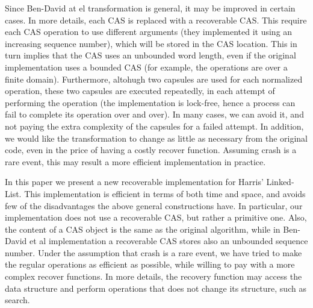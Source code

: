 Since Ben-David at el transformation is general, it may be improved in certain cases. In more details, each CAS is replaced with a recoverable CAS. This require each CAS operation to use different arguments (they implemented it using an increasing sequence number), which will be stored in the CAS location. This in turn implies that the CAS uses an unbounded word length, even if the original implementation uses a bounded CAS (for example, the operations are over a finite domain). Furthermore, altohugh two capsules are used for each normalized operation, these two capsules are executed repeatedly, in each attempt of performing the operation (the implementation is lock-free, hence a process can fail to complete its operation over and over). In many cases, we can avoid it, and not paying the extra complexity of the capsules for a failed attempt.
In addition, we would like the transformation to change as little as necessary from the original code, even in the price of having a costly recover function. Assuming crash is a rare event, this may result a more efficient implementation in practice.








In this paper we present a new recoverable implementation for Harris' Linked-List. This implementation is efficient in terms of both time and space, and avoids few of the disadvantages the above general constructions have. In particular, our implementation does not use a recoverable CAS, but rather a primitive one. Also, the content of a CAS object is the same as the original algorithm, while in Ben-David et al implementation a recoverable CAS stores also an unbounded sequence number. Under the assumption that crash is a rare event, we have tried to make the regular operations as efficient as possible, while willing to pay with a more complex recover functions. In more details, the recovery function may access the data structure and perform operations that does not change its structure, such as search.

